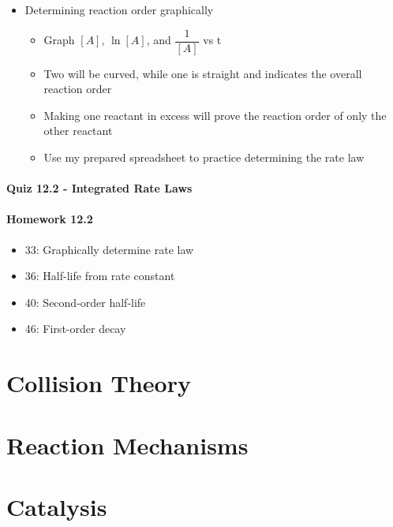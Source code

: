 \documentclass[12pt, openany, letterpaper]{memoir}
\begin{document}
\begin{itemize}
  \item Determining reaction order graphically
    \begin{itemize}
      \item Graph $[A]$, $\ln[A]$, and $\dfrac{1}{[A]}$ vs t
      \item Two will be curved, while one is straight and indicates the overall reaction order
      \item Making one reactant in excess will prove the reaction order of only the other reactant
      \item Use my prepared spreadsheet to practice determining the rate law
    \end{itemize}
\end{itemize}

\paragraph*{Quiz 12.2 - Integrated Rate Laws}
\paragraph*{Homework 12.2}
\begin{itemize}
  \item 33: Graphically determine rate law
  \item 36: Half-life from rate constant
  \item 40: Second-order half-life
  \item 46: First-order decay 
\end{itemize}

\section{Collision Theory}

\section{Reaction Mechanisms}

\section{Catalysis}
\end{document}
